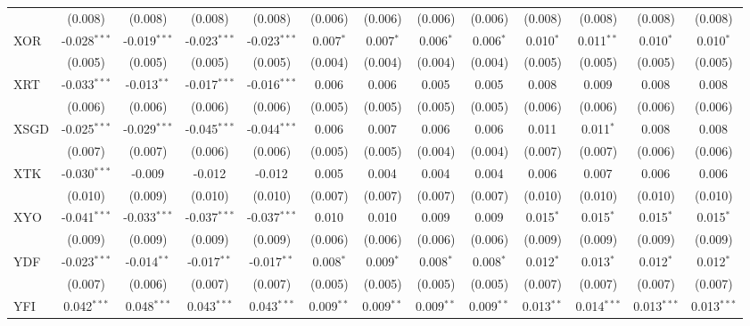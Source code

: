 \begin{table}[!htbp]
\begin{tabular}{@{\extracolsep{5pt}}lcccccccccccc}
  & (0.008) & (0.008) & (0.008) & (0.008) & (0.006) & (0.006) & (0.006) & (0.006) & (0.008) & (0.008) & (0.008) & (0.008) \\
 XOR & -0.028$^{***}$ & -0.019$^{***}$ & -0.023$^{***}$ & -0.023$^{***}$ & 0.007$^{*}$ & 0.007$^{*}$ & 0.006$^{*}$ & 0.006$^{*}$ & 0.010$^{*}$ & 0.011$^{**}$ & 0.010$^{*}$ & 0.010$^{*}$ \\
  & (0.005) & (0.005) & (0.005) & (0.005) & (0.004) & (0.004) & (0.004) & (0.004) & (0.005) & (0.005) & (0.005) & (0.005) \\
 XRT & -0.033$^{***}$ & -0.013$^{**}$ & -0.017$^{***}$ & -0.016$^{***}$ & 0.006$^{}$ & 0.006$^{}$ & 0.005$^{}$ & 0.005$^{}$ & 0.008$^{}$ & 0.009$^{}$ & 0.008$^{}$ & 0.008$^{}$ \\
  & (0.006) & (0.006) & (0.006) & (0.006) & (0.005) & (0.005) & (0.005) & (0.005) & (0.006) & (0.006) & (0.006) & (0.006) \\
 XSGD & -0.025$^{***}$ & -0.029$^{***}$ & -0.045$^{***}$ & -0.044$^{***}$ & 0.006$^{}$ & 0.007$^{}$ & 0.006$^{}$ & 0.006$^{}$ & 0.011$^{}$ & 0.011$^{*}$ & 0.008$^{}$ & 0.008$^{}$ \\
  & (0.007) & (0.007) & (0.006) & (0.006) & (0.005) & (0.005) & (0.004) & (0.004) & (0.007) & (0.007) & (0.006) & (0.006) \\
 XTK & -0.030$^{***}$ & -0.009$^{}$ & -0.012$^{}$ & -0.012$^{}$ & 0.005$^{}$ & 0.004$^{}$ & 0.004$^{}$ & 0.004$^{}$ & 0.006$^{}$ & 0.007$^{}$ & 0.006$^{}$ & 0.006$^{}$ \\
  & (0.010) & (0.009) & (0.010) & (0.010) & (0.007) & (0.007) & (0.007) & (0.007) & (0.010) & (0.010) & (0.010) & (0.010) \\
 XYO & -0.041$^{***}$ & -0.033$^{***}$ & -0.037$^{***}$ & -0.037$^{***}$ & 0.010$^{}$ & 0.010$^{}$ & 0.009$^{}$ & 0.009$^{}$ & 0.015$^{*}$ & 0.015$^{*}$ & 0.015$^{*}$ & 0.015$^{*}$ \\
  & (0.009) & (0.009) & (0.009) & (0.009) & (0.006) & (0.006) & (0.006) & (0.006) & (0.009) & (0.009) & (0.009) & (0.009) \\
 YDF & -0.023$^{***}$ & -0.014$^{**}$ & -0.017$^{**}$ & -0.017$^{**}$ & 0.008$^{*}$ & 0.009$^{*}$ & 0.008$^{*}$ & 0.008$^{*}$ & 0.012$^{*}$ & 0.013$^{*}$ & 0.012$^{*}$ & 0.012$^{*}$ \\
  & (0.007) & (0.006) & (0.007) & (0.007) & (0.005) & (0.005) & (0.005) & (0.005) & (0.007) & (0.007) & (0.007) & (0.007) \\
 YFI & 0.042$^{***}$ & 0.048$^{***}$ & 0.043$^{***}$ & 0.043$^{***}$ & 0.009$^{**}$ & 0.009$^{**}$ & 0.009$^{**}$ & 0.009$^{**}$ & 0.013$^{**}$ & 0.014$^{***}$ & 0.013$^{***}$ & 0.013$^{***}$ \\

\end{tabular}
\end{table}
